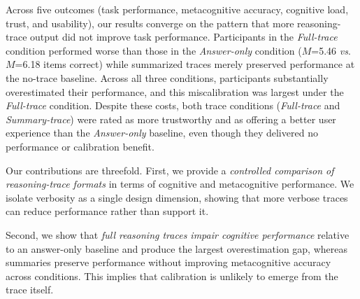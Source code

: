 \documentclass[acmlarge,review=true, anonymous=true]{acmart}
\begin{document}
Across five outcomes (task performance, metacognitive accuracy, cognitive load, trust, and usability), our results converge on the pattern that more reasoning-trace output did not improve task performance. Participants in the \textit{Full-trace} condition performed worse than those in the \textit{Answer-only} condition ($M$=5.46 \textit{vs}. $M$=6.18 items correct) while summarized traces merely preserved performance at the no-trace baseline. Across all three conditions, participants substantially overestimated their performance, and this miscalibration was largest under the \textit{Full-trace} condition. 
Despite these costs, both trace conditions (\textit{Full-trace} and \textit{Summary-trace}) were rated as more trustworthy and as offering a better user experience than the \textit{Answer-only} baseline, even though they delivered no performance or calibration benefit.




Our contributions are threefold. First, we provide a \textit{controlled comparison of reasoning-trace formats} in terms of cognitive and metacognitive performance. We isolate verbosity as a single design dimension, showing that more verbose traces can reduce performance rather than support it. 

Second, we show that \textit{full reasoning traces impair cognitive performance} relative to an answer-only baseline and produce the largest overestimation gap, whereas summaries preserve performance without improving metacognitive accuracy across conditions. This implies that calibration is unlikely to emerge from the trace itself. %
\end{document}
